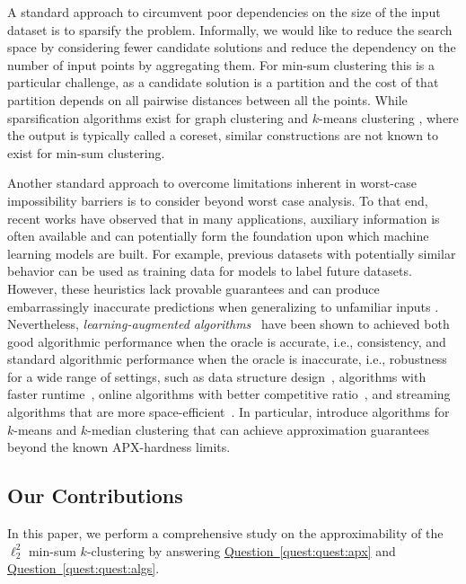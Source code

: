 \documentclass[10pt,a4paper]{amsart}
\newcommand{\namedref}[2]{\hyperref[#2]{#1~\ref*{#2}}}
\newcommand{\questref}[1]{\namedref{Question}{quest:#1}}
\begin{document}
A standard approach to circumvent poor dependencies on the size of the input dataset is to sparsify the problem. Informally, we would like to reduce the search space by considering fewer candidate solutions and reduce the dependency on the number of input points by aggregating them.
For min-sum clustering this is a particular challenge, as a candidate solution is a partition and the cost of that partition depends on all pairwise distances between all the points.
While sparsification algorithms exist for graph clustering \cite{JambulapatiLS23,Lee23} and $k$-means clustering \cite{Cohen-AddadSS21,Cohen-AddadLSSS22}, where the output is typically called a coreset, similar constructions are not known to exist for min-sum clustering.

Another standard approach to overcome limitations inherent in worst-case impossibility barriers is to consider beyond worst case analysis. 
To that end, recent works have observed that in many applications, auxiliary information is often available and can potentially form the foundation upon which machine learning models are built. 
For example, previous datasets with potentially similar behavior can be used as training data for models to label future datasets. 
However, these heuristics lack provable guarantees and can produce embarrassingly inaccurate predictions when generalizing to unfamiliar inputs \cite{SzegedyZSBEGF13}. 
Nevertheless, \emph{learning-augmented algorithms}~\cite{MitzenmacherV20} have been shown to achieved both good algorithmic performance when the oracle is accurate, i.e., consistency, and standard algorithmic performance when the oracle is inaccurate, i.e., robustness for a wide range of settings, such as data structure design~\cite{KraskaBCDP18,Mitzenmacher18,LinLW22}, algorithms with faster runtime~\cite{DinitzILMV21,ChenSVZ22,DaviesMVW23}, online algorithms with better competitive ratio~\cite{PurohitSK18,GollapudiP19,LattanziLMV20,WangLW20,WeiZ20,BamasMS20,ImKQP21,LykourisV21,AamandCI22,Anand0KP22,AzarPT22,GrigorescuLSSZ22,KhodakBTV22,JiangLLTZ22,AntoniadisCEPS23,ShinLLA23}, and streaming algorithms that are more space-efficient~\cite{HsuIKV19,IndykVY19,JiangLLRW20,ChenIW22,ChenEILNRSWWZ22,LLLVW23}. 
In particular, \cite{ErgunFSWZ22,NguyenCN23} introduce algorithms for $k$-means and $k$-median clustering that can achieve approximation guarantees beyond the known APX-hardness limits. 

\subsection{Our Contributions}
In this paper, we perform a comprehensive study on the approximability of the $\ell_2^2$ min-sum $k$-clustering by answering \questref{quest:apx} and \questref{quest:algs}. 
\end{document}
